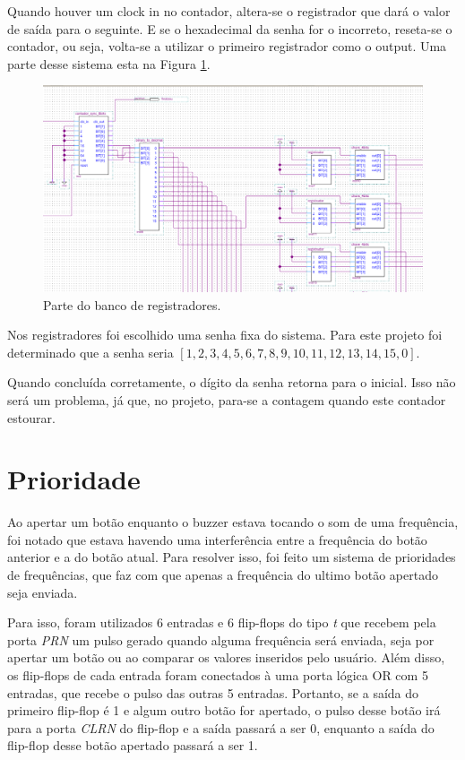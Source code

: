 Quando houver um clock in no contador, altera-se o registrador que dará o valor de saída para o seguinte. E se o hexadecimal da senha for o incorreto, reseta-se o contador, ou seja, volta-se a utilizar o primeiro registrador como o output. Uma parte desse sistema esta na Figura \ref{fig:2.16}.

\begin{figure}[H]
	\centering
	\includegraphics[width=1\columnwidth]{FIGURAS/cap_2/banco_registradores.png}
	\caption{Parte do banco de registradores.}
        \label{fig:2.16}
\end{figure}

Nos registradores foi escolhido uma senha fixa do sistema. Para este projeto foi determinado que a senha seria $[1, 2, 3, 4, 5, 6, 7, 8, 9, 10, 11, 12, 13, 14, 15, 0]$. 

Quando concluída corretamente, o dígito da senha retorna para o inicial. Isso não será um problema, já que, no projeto, para-se a contagem quando este contador estourar.


\section{Prioridade}

Ao apertar um botão enquanto o buzzer estava tocando o som de uma frequência, foi notado que estava havendo uma interferência entre a frequência do botão anterior e a do botão atual. Para resolver isso, foi feito um sistema de prioridades de frequências, que faz com que apenas a frequência do ultimo botão apertado seja enviada.

Para isso, foram utilizados 6 entradas e 6 flip-flops do tipo \emph{t} que recebem pela porta \emph{PRN} um pulso gerado quando alguma frequência será enviada, seja por apertar um botão ou ao comparar os valores inseridos pelo usuário. Além disso, os flip-flops de cada entrada foram conectados à uma porta lógica OR com 5 entradas, que recebe o pulso das outras 5 entradas. Portanto, se a saída do primeiro flip-flop é 1 e algum outro botão for apertado, o pulso desse botão irá para a porta \emph{CLRN} do flip-flop e a saída passará a ser 0, enquanto a saída do flip-flop desse botão apertado passará a ser 1.

